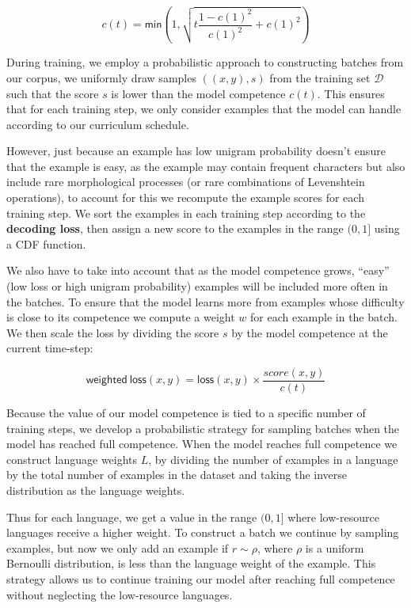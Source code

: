 \documentclass[11pt,a4paper]{article}
\begin{document}

\begin{equation}
    c(t) = \mathsf{min}(1, \sqrt{t\frac{1-c(1)^2}{c(1)^2}+c(1)^2})
\end{equation}

During training, we employ a probabilistic approach to constructing
batches from our corpus, we uniformly draw samples $((x, y), s)$ from
the training set $\mathcal{D}$ such that the score $s$ is lower than
the model competence $c(t)$. This ensures that for each training
step, we only consider examples that the model can handle according
to our curriculum schedule.

However, just because an example has low unigram probability doesn't
ensure that the example is easy, as the example may contain frequent
characters but also include rare morphological processes (or rare
combinations of Levenshtein operations), to account for this we
recompute the example scores for each training step. We sort the
examples in each training step according to the \textbf{decoding
loss}, then assign a new score to the examples in the range
$(0, 1]$ using a CDF function.

We also have to take into account that as the model competence grows,
``easy'' (low loss or high unigram probability) examples will be
included more often in the batches. To ensure that the model learns
more from examples whose difficulty is close to its competence we
compute a weight $w$ for each example in the batch. We then scale the
loss by dividing the score $s$ by the model competence at the current
time-step:

\begin{equation}
\mathsf{weighted\ loss}(x, y) = \mathsf{loss}(x, y) \times \frac{score(x, y)}{c(t)}
\end{equation}

Because the value of our model competence is tied to a specific number
of training steps, we develop a probabilistic strategy for sampling
batches when the model has reached full competence. 
When the model reaches full competence we construct language weights
$L$, by dividing the number of examples in a language by the total
number of examples in the dataset and taking the inverse distribution
as the language weights.

Thus for each language, we get a value in the range $(0,1]$ where
low-resource languages receive a higher weight.  To construct a batch
we continue by sampling examples, but now we only add an example if
$r \sim \rho$, where $\rho$ is a uniform Bernoulli distribution, is
less than the language weight of the example.  This strategy allows us
to continue training our model after reaching full competence without
neglecting the low-resource languages.
\end{document}
